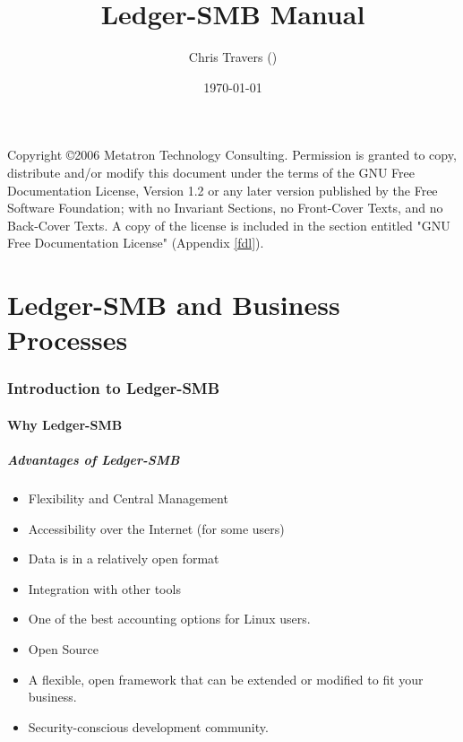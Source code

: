 \documentclass{article}
\title{Ledger-SMB Manual}
\author{Chris Travers (\metamail{chris})}
\date{\today}
\begin{document}
\maketitle

    Copyright \copyright  2006 Metatron Technology Consulting.
    Permission is granted to copy, distribute and/or modify this document
    under the terms of the GNU Free Documentation License, Version 1.2
    or any later version published by the Free Software Foundation;
    with no Invariant Sections, no Front-Cover Texts, and no Back-Cover Texts.
    A copy of the license is included in the section entitled "GNU
    Free Documentation License" (Appendix \ref{fdl}). 


\tableofcontents

\listoffigures

\clearpage

\part{Ledger-SMB and Business Processes}
\section{Introduction to Ledger-SMB}
\subsection{Why Ledger-SMB}
\subsubsection{Advantages of Ledger-SMB}
\begin{itemize}
\item Flexibility and Central Management
\item Accessibility over the Internet (for some users)
\item Data is in a relatively open format
\item Integration with other tools
\item One of the best accounting options for Linux users.
\item Open Source
\item A flexible, open framework that can be extended or modified to fit your 
business.
\item Security-conscious development community.
\end{itemize}
\end{document}

